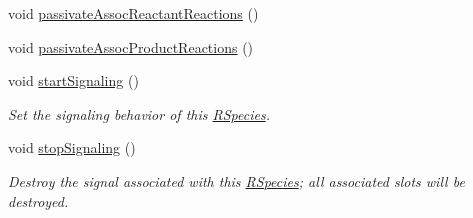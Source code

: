 \begin{DoxyCompactItemize}
void \hyperlink{classchem_1_1RSpecies_a0c33c29f86ee16b84151bc5f38953076}{passivate\-Assoc\-Reactant\-Reactions} ()
\item 
void \hyperlink{classchem_1_1RSpecies_aff8862396958db832848c94135282f1e}{passivate\-Assoc\-Product\-Reactions} ()
\item 
void \hyperlink{classchem_1_1RSpecies_a0beefdc1ec28646df87b0690a2d66734}{start\-Signaling} ()
\begin{DoxyCompactList}\small\item\em Set the signaling behavior of this \hyperlink{classchem_1_1RSpecies}{R\-Species}. \end{DoxyCompactList}\item 
void \hyperlink{classchem_1_1RSpecies_a3519759c28c5d50108753ebe6c67a537}{stop\-Signaling} ()
\begin{DoxyCompactList}\small\item\em Destroy the signal associated with this \hyperlink{classchem_1_1RSpecies}{R\-Species}; all associated slots will be destroyed. \end{DoxyCompactList}\end{DoxyCompactItemize}
